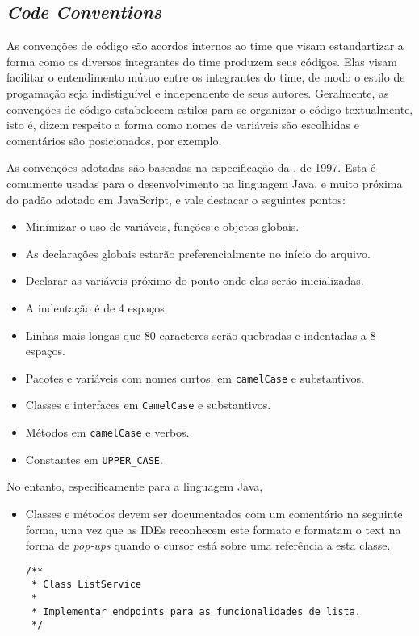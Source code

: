 \subsection{\emph{Code Conventions}}

As convenções de código são acordos internos ao time que visam
estandartizar a forma como os diversos integrantes do time produzem
seus códigos.  Elas visam facilitar o entendimento mútuo entre os
integrantes do time, de modo o estilo de progamação seja indistiguível
e independente de seus autores.  Geralmente, as convenções de código
estabelecem estilos para se organizar o código textualmente, isto é,
dizem respeito a forma como nomes de variáveis são escolhidas e
comentários são posicionados, por exemplo.

As convenções adotadas são baseadas na especificação da
\citeauthor{Oracle1997}, de 1997. Esta é comumente usadas para o
desenvolvimento na linguagem Java, e muito próxima do padão adotado em
JavaScript, e vale destacar o seguintes pontos:
\begin{itemize}
\item Minimizar o uso de variáveis, funções e objetos globais.
\item As declarações globais estarão preferencialmente no início do arquivo.
\item Declarar as variáveis próximo do ponto onde elas serão inicializadas.
\item A indentação é de 4 espaços.
\item Linhas mais longas que 80 caracteres serão quebradas e
  indentadas a 8 espaços.
\item Pacotes e variáveis com nomes curtos, em \texttt{camelCase} e substantivos.
\item Classes e interfaces em \texttt{CamelCase} e substantivos.
\item Métodos em \texttt{camelCase} e verbos.
\item Constantes em \texttt{UPPER\_CASE}.
\end{itemize}

No entanto, especificamente para a linguagem Java,
\begin{itemize}
\item Classes e métodos devem ser documentados com um comentário na
  seguinte forma, uma vez que as IDEs reconhecem este formato e
  formatam o text na forma de \emph{pop-ups} quando o cursor está
  sobre uma referência a esta classe.
\begin{verbatim}
/**
 * Class ListService
 *
 * Implementar endpoints para as funcionalidades de lista.
 */
\end{verbatim}
\end{itemize}

